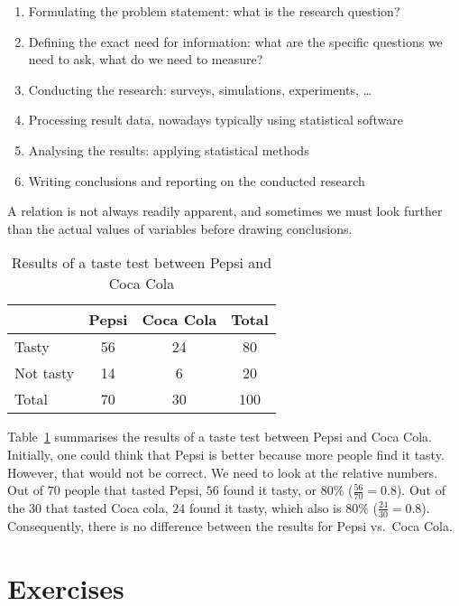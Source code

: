 \begin{enumerate}
	\item Formulating the problem statement: what is the research question?
	\item Defining the exact need for information: what are the specific questions we need to ask, what do we need to measure?
	\item Conducting the research: surveys, simulations, experiments, \dots
	\item Processing result data, nowadays typically using statistical software
	\item Analysing the results: applying statistical methods
	\item Writing conclusions and reporting on the conducted research
\end{enumerate}

A relation is not always readily apparent, and sometimes we must look further than the actual values of variables before drawing conclusions.

\begin{example}
    
    \begin{table}
    \centering
    \begin{tabular}{l||c|c||c}
        & Pepsi & Coca Cola & Total \\
        \hline \hline
        Tasty & 56 & 24 & 80 \\
        \hline
        Not tasty & 14 & 6 & 20 \\
        \hline \hline
        Total & 70 & 30 & 100
    \end{tabular}
    \caption{Results of a taste test between Pepsi and Coca Cola}
    \label{tab:pepsi-coca-cola}
    \end{table}

    Table~\ref{tab:pepsi-coca-cola} summarises the results of a taste test between Pepsi and Coca Cola. Initially, one could think that Pepsi is better because more people find it tasty. However, that would not be correct. We need to look at the relative numbers. Out of $70$ people that tasted Pepsi, $56$ found it tasty, or $80\%$ ($\frac{56}{70} = 0.8$). Out of the $30$ that tasted Coca cola, $24$ found it tasty, which also is $80\%$ ($\frac{24}{30} = 0.8$). Consequently, there is no difference between the results for Pepsi vs.~Coca Cola.
\end{example}

\section{Exercises}
\label{sec:exercises-process}

